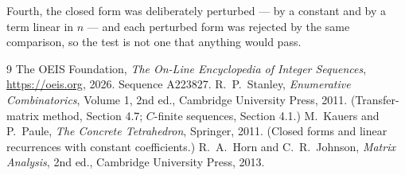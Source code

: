 \documentclass[11pt,a4paper]{article}
\theoremstyle{plain}
\theoremstyle{definition}
\begin{document}
Fourth, the closed form was deliberately perturbed --- by a constant and by a term linear in
$n$ --- and each perturbed form was rejected by the same comparison, so the test is not one
that anything would pass.

\begin{thebibliography}{9}
 The OEIS Foundation, \emph{The On-Line Encyclopedia of Integer
Sequences}, \url{https://oeis.org}, 2026. Sequence A223827.
 R.~P.~Stanley, \emph{Enumerative Combinatorics}, Volume 1, 2nd ed.,
Cambridge University Press, 2011. (Transfer-matrix method, Section 4.7; $C$-finite sequences,
Section 4.1.)
 M.~Kauers and P.~Paule, \emph{The Concrete Tetrahedron}, Springer, 2011.
(Closed forms and linear recurrences with constant coefficients.)
 R.~A.~Horn and C.~R.~Johnson, \emph{Matrix Analysis}, 2nd ed., Cambridge
University Press, 2013.
\end{thebibliography}
\end{document}

